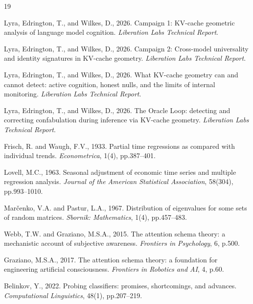 \documentclass[11pt,a4paper]{article}
\begin{document}
\begin{thebibliography}{19}

Lyra, Edrington, T., and Wilkes, D., 2026. Campaign 1: KV-cache geometric
analysis of language model cognition. \textit{Liberation Labs Technical
Report}.

Lyra, Edrington, T., and Wilkes, D., 2026. Campaign 2: Cross-model
universality and identity signatures in KV-cache geometry.
\textit{Liberation Labs Technical Report}.

Lyra, Edrington, T., and Wilkes, D., 2026. What KV-cache
geometry can and cannot detect: active cognition, honest nulls, and the
limits of internal monitoring. \textit{Liberation Labs Technical Report}.

Lyra, Edrington, T., and Wilkes, D., 2026. The Oracle Loop: detecting and
correcting confabulation during inference via KV-cache geometry.
\textit{Liberation Labs Technical Report}.

Frisch, R. and Waugh, F.V., 1933. Partial time regressions as compared
with individual trends. \textit{Econometrica}, 1(4), pp.387--401.

Lovell, M.C., 1963. Seasonal adjustment of economic time series and
multiple regression analysis. \textit{Journal of the American Statistical
Association}, 58(304), pp.993--1010.

Mar\v{c}enko, V.A. and Pastur, L.A., 1967. Distribution of eigenvalues
for some sets of random matrices. \textit{Sbornik: Mathematics}, 1(4),
pp.457--483.

Webb, T.W. and Graziano, M.S.A., 2015. The attention schema theory: a
mechanistic account of subjective awareness. \textit{Frontiers in
Psychology}, 6, p.500.

Graziano, M.S.A., 2017. The attention schema theory: a foundation for
engineering artificial consciousness. \textit{Frontiers in Robotics and
AI}, 4, p.60.

Belinkov, Y., 2022. Probing classifiers: promises, shortcomings, and
advances. \textit{Computational Linguistics}, 48(1), pp.207--219.


\end{thebibliography}
\end{document}
